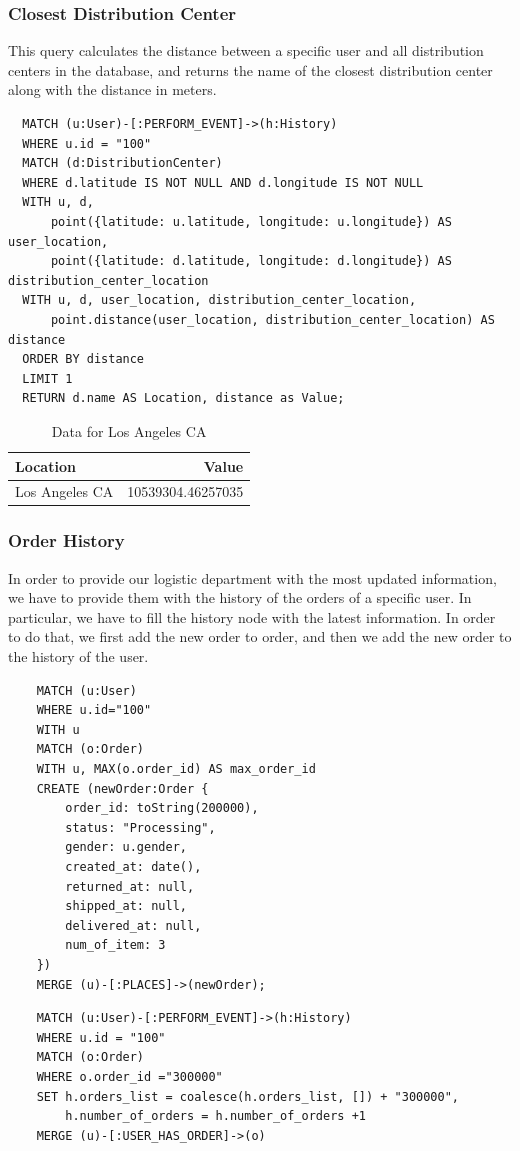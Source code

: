 \documentclass[a4paper,12pt]{article}
\begin{document}
\subsubsection{Closest Distribution Center}
This query calculates the distance between a specific user and all distribution centers in the database, and returns the name of the closest distribution center along with the distance in meters.
\begin{verbatim}
  MATCH (u:User)-[:PERFORM_EVENT]->(h:History)
  WHERE u.id = "100"
  MATCH (d:DistributionCenter)
  WHERE d.latitude IS NOT NULL AND d.longitude IS NOT NULL
  WITH u, d, 
      point({latitude: u.latitude, longitude: u.longitude}) AS user_location, 
      point({latitude: d.latitude, longitude: d.longitude}) AS distribution_center_location
  WITH u, d, user_location, distribution_center_location, 
      point.distance(user_location, distribution_center_location) AS distance
  ORDER BY distance
  LIMIT 1
  RETURN d.name AS Location, distance as Value;
\end{verbatim}

\begin{table}[h!]
  \centering
  \caption{Data for Los Angeles CA}
  \label{tab:los_angeles_data}
  \begin{tabular}{l r}
      \toprule
      \textbf{Location} & \textbf{Value} \\
      \midrule
      Los Angeles CA & 10539304.46257035 \\
      \bottomrule
  \end{tabular}
\end{table}

\subsubsection{Order History}
In order to provide our logistic department with the most updated information, we have to provide them with the history of the orders of a specific user.
In particular, we have to fill the history node with the latest information. In order to do that, we first add the new order to order, and then we add the new order to the history of the user.
\begin{verbatim}
    MATCH (u:User)
    WHERE u.id="100"
    WITH u
    MATCH (o:Order)
    WITH u, MAX(o.order_id) AS max_order_id
    CREATE (newOrder:Order { 
        order_id: toString(200000), 
        status: "Processing",
        gender: u.gender,
        created_at: date(),
        returned_at: null,
        shipped_at: null,
        delivered_at: null,
        num_of_item: 3
    })
    MERGE (u)-[:PLACES]->(newOrder);
\end{verbatim}
\begin{verbatim}
    MATCH (u:User)-[:PERFORM_EVENT]->(h:History)
    WHERE u.id = "100"
    MATCH (o:Order)
    WHERE o.order_id ="300000"
    SET h.orders_list = coalesce(h.orders_list, []) + "300000",
        h.number_of_orders = h.number_of_orders +1
    MERGE (u)-[:USER_HAS_ORDER]->(o)
\end{verbatim}
\end{document}
